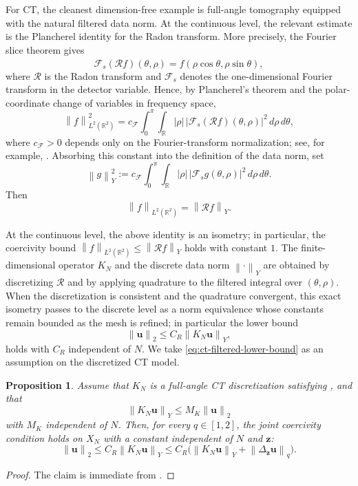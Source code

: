 \documentclass{article}
\newtheorem{proposition}[theorem]{Proposition}
\theoremstyle{remark}
\newcommand{\R}{\mathbb{R}}
\newcommand{\norm}[1]{\left\lVert #1 \right\rVert}
\newcommand{\bz}{{\bm{z}}}
\newcommand{\bu}{{\bm{u}}}
\begin{document}
For CT, the cleanest dimension-free example is full-angle tomography equipped
with the natural filtered data norm. At the continuous level, the relevant
estimate is the Plancherel identity for the Radon transform. More precisely, the
Fourier slice theorem gives
\[
\mathcal F_s(\mathcal R f)(\theta,\rho)
=
\widehat f(\rho\cos\theta,\rho\sin\theta),
\]
where $\mathcal R$ is the Radon transform and $\mathcal F_s$ denotes the
one-dimensional Fourier transform in the detector variable. Hence, by
Plancherel's theorem and the polar-coordinate change of variables in frequency
space,
\[
\norm{f}_{L^2(\R^2)}^2
=
c_{\mathcal F}
\int_0^\pi\!\int_\R
|\rho|\,|\mathcal F_s(\mathcal R f)(\theta,\rho)|^2\,d\rho\,d\theta ,
\]
where $c_{\mathcal F}>0$ depends only on the Fourier-transform normalization; see,
for example, \cite{natterer2001}. Absorbing this
constant into the definition of the data norm, set
\[
\norm{g}_Y^2:=
c_{\mathcal F}
\int_0^\pi\!\int_\R
|\rho|\,|\mathcal F_s g(\theta,\rho)|^2\,d\rho\,d\theta .
\]
Then
\[
\norm{f}_{L^2(\R^2)}=\norm{\mathcal R f}_Y .
\]

At the continuous level, the above identity 
is an isometry; in particular, the coercivity bound
$\norm{f}_{L^2(\R^2)}\le\norm{\mathcal R f}_Y$ holds with constant $1$. The
finite-dimensional operator $K_N$ and the discrete data norm $\norm{\cdot}_Y$ are
obtained by discretizing $\mathcal R$ and by applying quadrature to the filtered
integral over $(\theta,\rho)$. When the discretization is consistent and the
quadrature convergent, this exact isometry passes to the discrete level as a norm
equivalence whose constants remain bounded as the mesh is refined; in particular
the lower bound
\begin{equation}\label{eq:ct-filtered-lower-bound}
\norm{\bu}_2\le C_R\norm{K_N\bu}_Y,
\end{equation}
holds with $C_R$ independent of $N$. We take \cref{eq:ct-filtered-lower-bound}
as an assumption on the discretized CT model.

\begin{proposition}\label{prop:dim-free-CT}
Assume that $K_N$ is a full-angle CT discretization satisfying
, and that
\[
\norm{K_N\bu}_Y\le M_K\norm{\bu}_2
\]
with $M_K$ independent of $N$. Then, for every $q\in[1,2]$, the joint coercivity
condition holds on $X_N$ with a constant independent of $N$ and $\bz$:
\[
\norm{\bu}_2
\le
C_R\norm{K_N\bu}_Y
\le
C_R\bigl(\norm{K_N\bu}_Y+\norm{\Delta_\bz\bu}_q\bigr).
\]
\end{proposition}

\begin{proof}
The claim is immediate from 
.
\end{proof}







\end{document}

